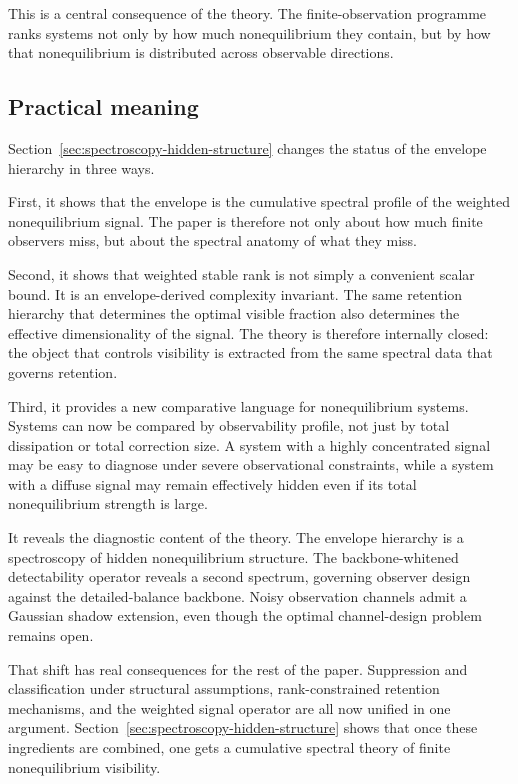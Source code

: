 \documentclass[11pt,a4paper]{article}
\numberwithin{equation}{section}
\theoremstyle{thmcompact}
\theoremstyle{remark}
\begin{document}
This is a central consequence of the theory. The finite-observation programme ranks systems not only by how much nonequilibrium they contain, but by how that nonequilibrium is distributed across observable directions.

\subsection{Practical meaning}

Section~\ref{sec:spectroscopy-hidden-structure} changes the status of the envelope hierarchy in three ways.

First, it shows that the envelope is the cumulative spectral profile of the weighted nonequilibrium signal. The paper is therefore not only about how much finite observers miss, but about the spectral anatomy of what they miss.

Second, it shows that weighted stable rank is not simply a convenient scalar bound. It is an envelope-derived complexity invariant. The same retention hierarchy that determines the optimal visible fraction also determines the effective dimensionality of the signal. The theory is therefore internally closed: the object that controls visibility is extracted from the same spectral data that governs retention.

Third, it provides a new comparative language for nonequilibrium systems. Systems can now be compared by observability profile, not just by total dissipation or total correction size. A system with a highly concentrated signal may be easy to diagnose under severe observational constraints, while a system with a diffuse signal may remain effectively hidden even if its total nonequilibrium strength is large.

It reveals the diagnostic content of the theory. The envelope hierarchy is a spectroscopy of hidden nonequilibrium structure. The backbone-whitened detectability operator reveals a second spectrum, governing observer design against the detailed-balance backbone. Noisy observation channels admit a Gaussian shadow extension, even though the optimal channel-design problem remains open.

That shift has real consequences for the rest of the paper. Suppression and classification under structural assumptions, rank-constrained retention mechanisms, and the weighted signal operator are all now unified in one argument. Section~\ref{sec:spectroscopy-hidden-structure} shows that once these ingredients are combined, one gets a cumulative spectral theory of finite nonequilibrium visibility.
\end{document}

